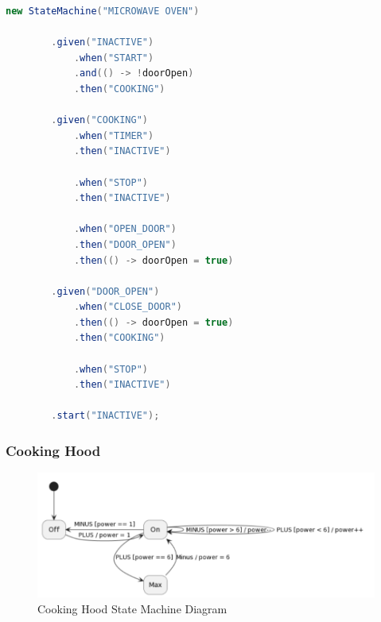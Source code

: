 \documentclass{article}
\begin{document}
\begin{lstlisting}[language=java, caption={Microwave Oven Implemntation}, captionpos=b]
    new StateMachine("MICROWAVE OVEN")

        .given("INACTIVE")
            .when("START")
            .and(() -> !doorOpen)
            .then("COOKING")

        .given("COOKING")
            .when("TIMER")
            .then("INACTIVE")

            .when("STOP")
            .then("INACTIVE")

            .when("OPEN_DOOR")
            .then("DOOR_OPEN")
            .then(() -> doorOpen = true)

        .given("DOOR_OPEN")
            .when("CLOSE_DOOR")
            .then(() -> doorOpen = true)
            .then("COOKING")

            .when("STOP")
            .then("INACTIVE")
            
        .start("INACTIVE");
\end{lstlisting}

\subsubsection{Cooking Hood}

\begin{figure}[H]
    \centering
    \includegraphics[scale=.60]{./figures/hood.PNG}
    \caption{Cooking Hood State Machine Diagram}
\end{figure}
\end{document}
